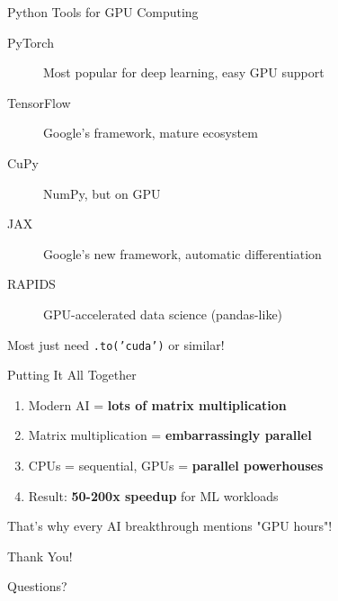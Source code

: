 \documentclass[10pt]{beamer}
\begin{document}
\begin{frame}{Python Tools for GPU Computing}
  \begin{description}
    \item[PyTorch] Most popular for deep learning, easy GPU support
    \item[TensorFlow] Google's framework, mature ecosystem
    \item[CuPy] NumPy, but on GPU
    \item[JAX] Google's new framework, automatic differentiation
    \item[RAPIDS] GPU-accelerated data science (pandas-like)
  \end{description}
  
  \vspace{1em}
  \centering
  \small Most just need \texttt{.to('cuda')} or similar!
\end{frame}

\begin{frame}{Putting It All Together}
  \begin{enumerate}
    \item Modern AI = \textbf{lots of matrix multiplication}
    \item Matrix multiplication = \textbf{embarrassingly parallel}
    \item CPUs = sequential, GPUs = \textbf{parallel powerhouses}
    \item Result: \textbf{50-200x speedup} for ML workloads
  \end{enumerate}
  
  \vspace{2em}
  \centering
  \Large That's why every AI breakthrough mentions "GPU hours"!
\end{frame}

\begin{frame}[standout]
  \Huge Thank You!
  
  \vspace{2em}
  \Large Questions?
\end{frame}
\end{document}
